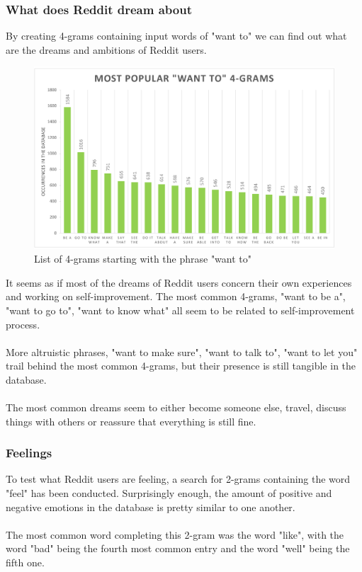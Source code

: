 \documentclass[openany]{article}
\begin{document}
\subsubsection{What does Reddit dream about}
By creating 4-grams containing input words of "want to" we can find out what are the dreams and ambitions of Reddit users.
\begin{figure}[H]
    \centering
    \includegraphics[width=\textwidth]{wantto.pdf}
    \caption{List of 4-grams starting with the phrase "want to"}
    \label{fig:mesh1}
\end{figure}
It seems as if most of the dreams of Reddit users concern their own experiences and working on self-improvement. The most common 4-grams, "want to be a", "want to go to", "want to know what" all seem to be related to self-improvement process. \\ \\
More altruistic phrases, "want to make sure", "want to talk to", "want to let you" trail behind the most common 4-grams, but their presence is still tangible in the database. \\ \\
The most common dreams seem to either become someone else, travel, discuss things with others or reassure that everything is still fine.

\subsubsection{Feelings}
To test what Reddit users are feeling, a search for 2-grams containing the word "feel" has been conducted. Surprisingly enough, the amount of positive and negative emotions in the database is pretty similar to one another.\\ \\
The most common word completing this 2-gram was the word "like", with the word "bad" being the fourth most common entry and the word "well" being the fifth one.
\end{document}
